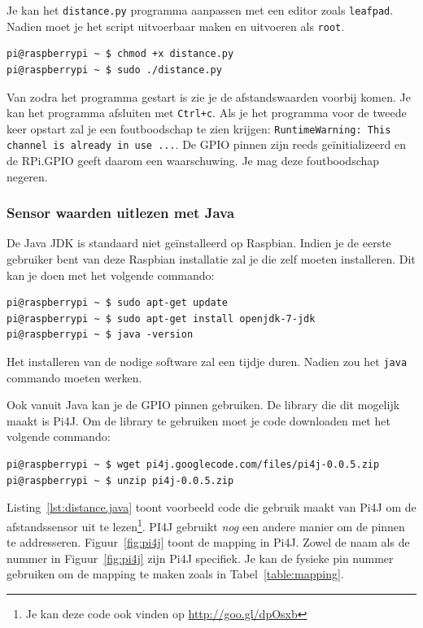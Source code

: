 \documentclass[a4paper]{article}
\begin{document}
  Je kan het \texttt{distance.py} programma aanpassen met een editor
zoals \texttt{leafpad}.  Nadien moet je het script uitvoerbaar maken
en uitvoeren als \texttt{root}.

\begin{lstlisting}
pi@raspberrypi ~ $ chmod +x distance.py
pi@raspberrypi ~ $ sudo ./distance.py
\end{lstlisting}

  Van zodra het programma gestart is zie je de afstandswaarden voorbij
komen.  Je kan het programma afsluiten met \texttt{Ctrl+c}.  Als je
het programma voor de tweede keer opstart zal je een foutboodschap te
zien krijgen: \texttt{RuntimeWarning: This channel is already in use
...}.  De GPIO pinnen zijn reeds ge\"initializeerd en de RPi.GPIO
geeft daarom een waarschuwing.  Je mag deze foutboodschap negeren.

    \subsubsection{Sensor waarden uitlezen met Java}

    De Java JDK is standaard niet ge\"installeerd op Raspbian.
Indien je de eerste gebruiker bent van deze Raspbian installatie zal je
die zelf moeten installeren.  Dit kan je doen met het volgende commando:
\begin{lstlisting}
pi@raspberrypi ~ $ sudo apt-get update
pi@raspberrypi ~ $ sudo apt-get install openjdk-7-jdk
pi@raspberrypi ~ $ java -version
\end{lstlisting}

    Het installeren van de nodige software zal een tijdje duren.
Nadien zou het \texttt{java} commando moeten werken.

    Ook vanuit Java kan je de GPIO pinnen gebruiken.  De library die
dit mogelijk maakt is Pi4J.  Om de library te gebruiken moet je code
downloaden met het volgende commando:
\begin{lstlisting}
pi@raspberrypi ~ $ wget pi4j.googlecode.com/files/pi4j-0.0.5.zip
pi@raspberrypi ~ $ unzip pi4j-0.0.5.zip
\end{lstlisting}

    Listing~\ref{lst:distance.java} toont voorbeeld code die gebruik
maakt van Pi4J om de afstandssensor uit te lezen\footnote{Je kan deze
code ook vinden op \url{http://goo.gl/dpOsxb}}.  PI4J gebruikt
\emph{nog} een andere manier om de pinnen te addresseren.
Figuur~\ref{fig:pi4j} toont de mapping in Pi4J.  Zowel de naam als de
nummer in Figuur~\ref{fig:pi4j} zijn Pi4J specifiek.  Je kan de
fysieke pin nummer gebruiken om de mapping te maken zoals in
Tabel~\ref{table:mapping}.
\end{document}

